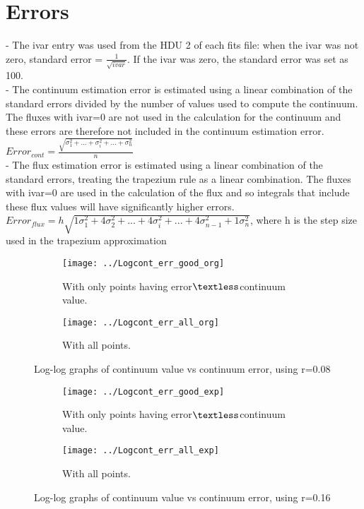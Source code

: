 \documentclass[12pt]{article}
\begin{document}
\section{Errors}
- The ivar entry was used from the HDU 2 of each fits file: when the ivar was not zero, standard error =  $\frac{1}{\sqrt{ivar}}$. If the ivar was zero, the standard error was set as 100. \\
- The continuum estimation error is estimated using a linear combination of the standard errors divided by the number of values used to compute the continuum. The fluxes with ivar=0 are not used in the calculation for the continuum and these errors are therefore not included in the continuum estimation error.\\
$Error_{cont} = \frac{\sqrt{\sigma_1^2 + ... + \sigma_i^2 + ... + \sigma_n^2}}{n}$\\
- The flux estimation error is estimated using a linear combination of the standard errors, treating the trapezium rule as a linear combination. The fluxes with ivar=0 are used in the calculation of the flux and so integrals that include these flux values will have significantly higher errors.\\
$Error_{flux} = h\sqrt{1\sigma_1^2+4\sigma_2^2+ ... + 4\sigma_i^2 + ... + 4\sigma_{n-1}^2+1\sigma_n^2}$, where h is the step size used in the trapezium approximation\\
\begin{figure}
\begin{subfigure}{.5\textwidth}
\texttt{[image: ../Logcont\_err\_good\_org]}
\caption{With only points having error$\textless$continuum value.}
\end{subfigure}
\begin{subfigure}{.4\textwidth}
\texttt{[image: ../Logcont\_err\_all\_org]}
\caption{With all points.}
\end{subfigure}
\caption{Log-log graphs of continuum value vs continuum error, using r=0.08}
\end{figure}
\begin{figure}
\begin{subfigure}{.5\textwidth}
\texttt{[image: ../Logcont\_err\_good\_exp]}
\caption{With only points having error$\textless$continuum value.}
\end{subfigure}
\begin{subfigure}{.4\textwidth}
\texttt{[image: ../Logcont\_err\_all\_exp]}
\caption{With all points.}
\end{subfigure}
\caption{Log-log graphs of continuum value vs continuum error, using r=0.16}
\end{figure}
\end{document}
